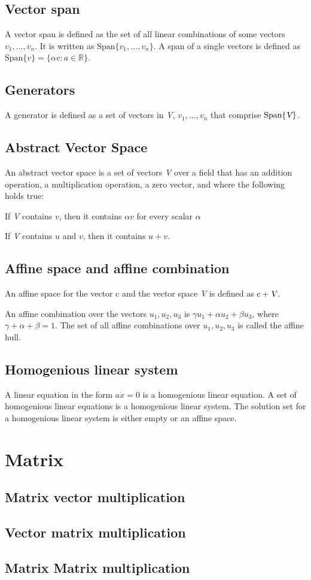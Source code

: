 \documentclass[11pt, oneside]{article}   	%
\begin{document}
\subsection{Vector span}

A vector span is defined as the set of all linear combinations of some vectors $v_1, \dots, v_n$. It is written as $\text{Span} \{v_1, \dots, v_n \}$. A span of a single vectors is defined as $\text{Span} \{v\} = \{ \alpha v : a \in \mathbb{R}\}$.

\subsection{Generators}

A generator is defined as a set of vectors in \textsl{V}, $v_1, \dots, v_n$ that comprise $\text{Span}\{\textsl{V}\}$. 

\subsection{Abstract Vector Space}

An abstract vector space is a set of vectors \textsl{V} over a field  that has an addition operation, a multiplication operation, a zero vector, and where the following holds true:

If \textsl{V} contains $v$, then it contains $\alpha v$ for every scalar $\alpha$

If \textsl{V} contains $u$ and $v$, then it contains $u + v$.

\subsection{Affine space and affine combination}

An affine space for the vector c and the vector space \textsl{V} is defined as $c + \textsl{V}$. 

An affine combination over the vectors $u_1, u_2, u_3$ is $\gamma u_1 + \alpha u_2 + \beta u_3$, where $\gamma + \alpha + \beta = 1$. The set of all affine combinations over $u_1, u_2, u_3$ is called the affine hull.

\subsection{Homogenious linear system}

A linear equation in the form $a \dot x = 0$ is a homogenious linear equation. A set of homogenious linear equations is a homogenious linear system. The solution set for a homogenious linear system is either empty or an affine space.

\section{Matrix}

\subsection{Matrix vector multiplication}

\subsection{Vector matrix multiplication}

\subsection{Matrix Matrix multiplication}
\end{document}
